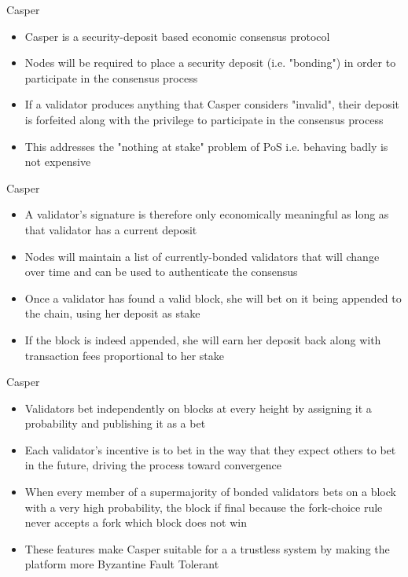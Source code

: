 \documentclass[11pt]{beamer}
\begin{document}

\begin{frame}{Casper}
	\begin{itemize}
		\item Casper is a security-deposit based economic consensus protocol
		\item Nodes will be required to place a security deposit (i.e. "bonding") in order to participate in the consensus process
		\item If a validator produces anything that Casper considers "invalid", their deposit is forfeited along with the privilege to participate in the consensus process
		\item This addresses the "nothing at stake" problem of PoS i.e. behaving badly is not expensive
	\end{itemize}
\end{frame}


\begin{frame}{Casper}
	\begin{itemize}
		\item A validator's signature is therefore only economically meaningful as long as that validator has a current deposit
		\item Nodes will maintain a list of currently-bonded validators that will change over time and can be used to authenticate the consensus
		\item Once a validator has found a valid block, she will bet on it being appended to the chain, using her deposit as stake
		\item If the block is indeed appended, she will earn her deposit back along with transaction fees proportional to her stake
	\end{itemize}
\end{frame}


\begin{frame}{Casper}
	\begin{itemize}
		\item Validators bet independently on blocks at every height by assigning it a probability and publishing it as a bet
		\item Each validator's incentive is to bet in the way that they expect others to bet in the future, driving the process toward convergence
		\item When every member of a supermajority of bonded validators bets on a block with a very high probability, the block if final because the fork-choice rule never accepts a fork which block does not win
		\item These features make Casper suitable for a a trustless system by making the platform more Byzantine Fault Tolerant
	\end{itemize}
\end{frame}
\end{document}
